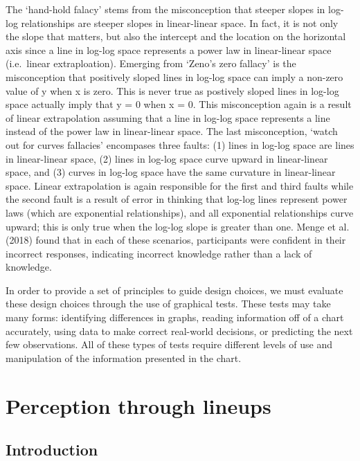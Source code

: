 \documentclass[print]{nuthesis}
\begin{document}
The `hand-hold falacy' stems from the misconception that steeper slopes in log-log relationships are steeper slopes in linear-linear space.
In fact, it is not only the slope that matters, but also the intercept and the location on the horizontal axis since a line in log-log space represents a power law in linear-linear space (i.e.~linear extraploation).
Emerging from `Zeno's zero fallacy' is the misconception that positively sloped lines in log-log space can imply a non-zero value of y when x is zero. This is never true as postively sloped lines in log-log space actually imply that y = 0 when x = 0.
This misconception again is a result of linear extrapolation assuming that a line in log-log space represents a line instead of the power law in linear-linear space.
The last misconception, `watch out for curves fallacies' encompases three faults: (1) lines in log-log space are lines in linear-linear space, (2) lines in log-log space curve upward in linear-linear space, and (3) curves in log-log space have the same curvature in linear-linear space.
Linear extrapolation is again responsible for the first and third faults while the second fault is a result of error in thinking that log-log lines represent power laws (which are exponential relationships), and all exponential relationships curve upward; this is only true when the log-log slope is greater than one. Menge et al. (2018) found that in each of these scenarios, participants were confident in their incorrect responses, indicating incorrect knowledge rather than a lack of knowledge.

In order to provide a set of principles to guide design choices, we must evaluate these design choices through the use of graphical tests.
These tests may take many forms: identifying differences in graphs, reading information off of a chart accurately, using data to make correct real-world decisions, or predicting the next few observations.
All of these types of tests require different levels of use and manipulation of the information presented in the chart.

\hypertarget{lineups}{%
\chapter{Perception through lineups}\label{lineups}}

\hypertarget{introduction}{%
\section{Introduction}\label{introduction}}
\end{document}
